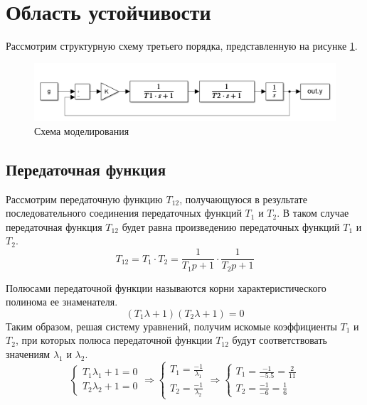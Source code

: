 \section{Область устойчивости}
Рассмотрим структурную схему третьего порядка, представленную на рисунке \ref{fig:scheme2}.

\begin{figure}[ht!]
    \centering
    \includegraphics[width=\textwidth]{media/scheme2.png}
    \caption{Схема моделирования}
    \label{fig:scheme2}
\end{figure}

\subsection{Передаточная функция}

Рассмотрим передаточную функцию $T_{12}$, получающуюся в результате последовательного соединения 
передаточных функций $T_1$ и $T_2$. В таком случае передаточная функция $T_{12}$ будет равна 
произведению передаточных функций $T_1$ и $T_2$.
\begin{equation}
    T_{12} = T_1 \cdot T_2 = \frac{1}{T_1p + 1} \cdot \frac{1}{T_2p + 1} 
\end{equation}

Полюсами передаточной функции называются корни характеристического полинома ее знаменателя. 
\begin{equation}
    (T_1\lambda + 1)(T_2\lambda + 1) = 0
\end{equation}
Таким образом, решая систему уравнений, получим искомые коэффициенты $T_1$ и $T_2$, при 
которых полюса передаточной функции $T_{12}$ будут соответствовать значениям $\lambda_1$ и $\lambda_2$.
\begin{equation}
    \begin{cases}
        T_1\lambda_1 + 1 = 0 \\
        T_2\lambda_2 + 1 = 0
    \end{cases} \Rightarrow
    \begin{cases}
        T_1 = \frac{-1}{\lambda_1} \\
        T_2 = \frac{-1}{\lambda_2}
    \end{cases} \Rightarrow
    \begin{cases}
        T_1 = \frac{-1}{-5.5} = \frac{2}{11} \\ 
        T_2 = \frac{-1}{-6} = \frac{1}{6}
    \end{cases}
    \label{eq:T1T2}
\end{equation}


